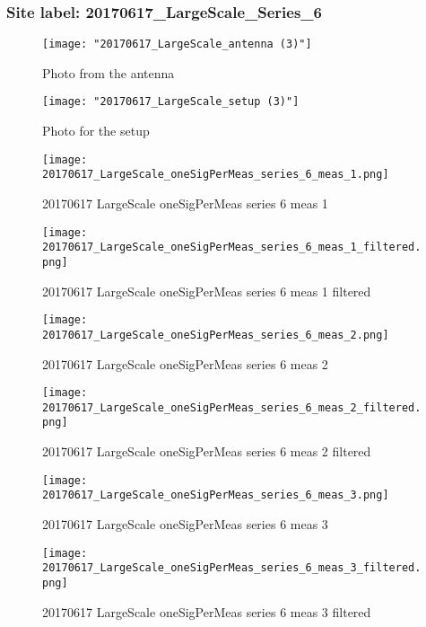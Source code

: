 \subsubsection{Site label: 20170617\_LargeScale\_Series\_6}
\begin{figure}[ht] \caption{Photo from the antenna}
\texttt{[image: "20170617\_LargeScale\_antenna (3)"]}\centering\end{figure}
\begin{figure}[ht] \caption{Photo for the setup}
\texttt{[image: "20170617\_LargeScale\_setup (3)"]}\centering\end{figure}
\begin{figure}[ht] \caption{20170617 LargeScale oneSigPerMeas series 6 meas 1}
\texttt{[image: 20170617\_LargeScale\_oneSigPerMeas\_series\_6\_meas\_1.png]}\centering\end{figure}
\begin{figure}[ht] \caption{20170617 LargeScale oneSigPerMeas series 6 meas 1 filtered}
\texttt{[image: 20170617\_LargeScale\_oneSigPerMeas\_series\_6\_meas\_1\_filtered.png]}\centering\end{figure}
\begin{figure}[ht] \caption{20170617 LargeScale oneSigPerMeas series 6 meas 2}
\texttt{[image: 20170617\_LargeScale\_oneSigPerMeas\_series\_6\_meas\_2.png]}\centering\end{figure}
\begin{figure}[ht] \caption{20170617 LargeScale oneSigPerMeas series 6 meas 2 filtered}
\texttt{[image: 20170617\_LargeScale\_oneSigPerMeas\_series\_6\_meas\_2\_filtered.png]}\centering\end{figure}
\begin{figure}[ht] \caption{20170617 LargeScale oneSigPerMeas series 6 meas 3}
\texttt{[image: 20170617\_LargeScale\_oneSigPerMeas\_series\_6\_meas\_3.png]}\centering\end{figure}
\begin{figure}[ht] \caption{20170617 LargeScale oneSigPerMeas series 6 meas 3 filtered}
\texttt{[image: 20170617\_LargeScale\_oneSigPerMeas\_series\_6\_meas\_3\_filtered.png]}\centering\end{figure}
\clearpage
